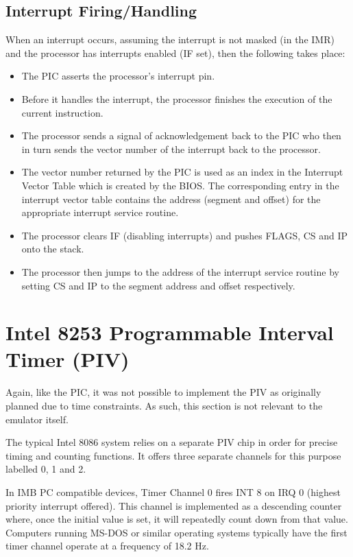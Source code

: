     \subsection{Interrupt Firing/Handling}
        When an interrupt occurs, assuming the interrupt is not masked (in the IMR) and the processor has interrupts enabled (IF set), then the following takes place:
        
        \begin{itemize}
            \item The PIC asserts the processor's interrupt pin.
            \item Before it handles the interrupt, the processor finishes the execution of the current instruction.
            \item The processor sends a signal of acknowledgement back to the PIC who then in turn sends the vector number of the interrupt back to the processor.
            \item The vector number returned by the PIC is used as an index in the Interrupt Vector Table which is created by the BIOS. The corresponding entry in the interrupt vector table contains the address (segment and offset) for the appropriate interrupt service routine.
            \item The processor clears IF (disabling interrupts) and pushes FLAGS, CS and IP onto the stack.
            \item The processor then jumps to the address of the interrupt service routine by setting CS and IP to the segment address and offset respectively.
        \end{itemize}

\section{Intel 8253 Programmable Interval Timer (PIV)}
    Again, like the PIC, it was not possible to implement the PIV as originally planned due to time constraints. As such, this section is not relevant to the emulator itself.

    The typical Intel 8086 system relies on a separate PIV chip in order for precise timing and counting functions. It offers three separate channels for this purpose labelled 0, 1 and 2.

    In IMB PC compatible devices, Timer Channel 0 fires INT 8 on IRQ 0 (highest priority interrupt offered). This channel is implemented as a descending counter where, once the initial value is set, it will repeatedly count down from that value. Computers running MS-DOS or similar operating systems typically have the first timer channel operate at a frequency of 18.2 Hz.

